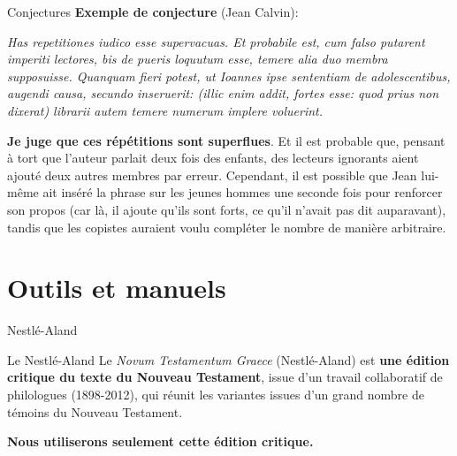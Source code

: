 \documentclass[11pt]{beamer}
\begin{document}
\begin{frame}{Conjectures}
    \textbf{Exemple de conjecture} (Jean Calvin):\\
    \begin{minipage}{.4\textwidth}
    \footnotesize
    \begin{exampleblock}{}
    \textit{Has repetitiones iudico esse supervacuas. Et probabile est, cum falso putarent imperiti lectores, bis de pueris loquutum esse, temere alia duo membra supposuisse. Quanquam fieri potest, ut Ioannes ipse sententiam de adolescentibus, augendi causa, secundo inseruerit: (illic enim addit, fortes esse: quod prius non dixerat) librarii autem temere numerum implere voluerint.}
    \end{exampleblock}
    \end{minipage}%
    \hfill
    \begin{minipage}{.4\textwidth}
    \footnotesize
    \textbf{Je juge que ces répétitions sont superflues}. Et il est probable que, pensant à tort que l’auteur parlait deux fois des enfants, des lecteurs ignorants aient ajouté deux autres membres par erreur. Cependant, il est possible que Jean lui-même ait inséré la phrase sur les jeunes hommes une seconde fois pour renforcer son propos (car là, il ajoute qu'ils sont forts, ce qu'il n'avait pas dit auparavant), tandis que les copistes auraient voulu compléter le nombre de manière arbitraire.
    \end{minipage}
\end{frame}



\section{Outils et manuels}

\begin{frame}{Nestlé-Aland}
    \begin{block}{Le Nestlé-Aland}
    Le \textit{Novum Testamentum Graece} (Nestlé-Aland) est \textbf{une édition critique du texte du Nouveau Testament}, issue d'un travail collaboratif de philologues (1898-2012), qui réunit les variantes issues d'un grand nombre de témoins du Nouveau Testament.
    \end{block} 

    \textbf{Nous utiliserons seulement cette édition critique.}
\end{frame}
\end{document}
